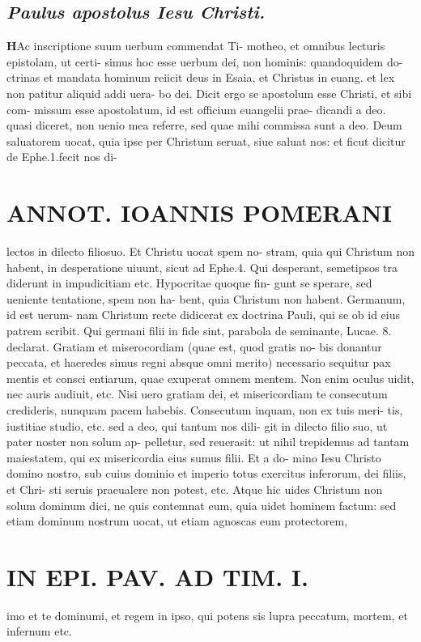 \documentclass{article}
\begin{document}
\begin{pages}
\subsection*{\textit{Paulus apostolus Iesu Christi. }}\pstart \huge\textbf{H}\normalsize Ac inscriptione suum uerbum commendat Ti- motheo, et omnibus lecturis epistolam, ut certi- simus hoc esse uerbum dei, non hominis: quandoquidem do- ctrinas et mandata hominum reiicit deus in Esaia, et Christus in euang. et lex non patitur aliquid addi uera- bo dei. Dicit ergo se apostolum esse Christi, et sibi com- missum esse apostolatum, id est officium euangelii prae- dicandi a deo. quasi diceret, non uenio mea referre, sed quae mihi commissa sunt a deo.  \pend\pstart Deum saluatorem uocat, quia ipse per Christum seruat, siue saluat nos: et ficut dicitur de Ephe.1.fecit nos di-  \pend
\section*{ANNOT. IOANNIS POMERANI }\pstart lectos in dilecto filiosuo. Et Christu uocat spem no- stram, quia qui Christum non habent, in desperatione uiuunt, sicut ad Ephe.4. Qui desperant, semetipsos tra diderunt in impudicitiam etc. Hypocritae quoque  fin- gunt se sperare, sed ueniente tentatione, spem non ha- bent, quia Christum non habent. Germanum, id est uerum- nam Christum recte didicerat ex doctrina Pauli, qui se ob id eius patrem scribit. Qui germani filii in fide sint, parabola de seminante, Lucae. 8. declarat.  \pend\pstart Gratiam et miserocordiam (quae est, quod gratis no- bis donantur peccata, et haeredes simus regni absque  omni merito) necessario sequitur pax mentis et consci entiarum, quae exuperat omnem mentem. Non enim oculus uidit, nec auris audiuit, etc. Nisi uero gratiam dei, et misericordiam te consecutum credideris, nunquam pacem habebis. Consecutum inquam, non ex tuis meri- tis, iustitiae studio, etc. sed a deo, qui tantum nos dili- git in dilecto filio suo, ut pater noster non solum ap- pelletur, sed reuerasit: ut nihil trepidemus ad tantam maiestatem, qui ex misericordia eius sumus filii. Et a do- mino Iesu Christo domino nostro, sub cuius dominio et imperio totus exercitus inferorum, dei filiis, et Chri- sti seruis praeualere non potest, etc. Atque hic uides Christum non solum dominum dici, ne quis contemnat eum, quia uidet hominem factum: sed etiam dominum nostrum uocat, ut etiam agnoscas eum protectorem,  \pend
\section*{IN EPI. PAV. AD TIM. I. }
\marginpar{[ p.80 ]}\pstart imo et te dominumi, et regem in ipso, qui potens sis lupra peccatum, mortem, et infernum etc.  \pend
{}
{}

\end{pages}
\end{document}
